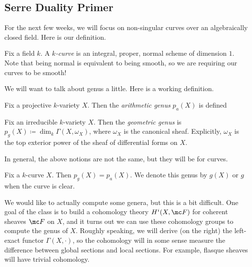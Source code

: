 \documentclass[../notes.tex]{subfiles}
\begin{document}
\subsection{Serre Duality Primer}
For the next few weeks, we will focus on non-singular curves over an algebraically closed field. Here is our definition.
\begin{definition}[curve]
	Fix a field $k$. A \textit{$k$-curve} is an integral, proper, normal scheme of dimension $1$. Note that being normal is equivalent to being smooth, so we are requiring our curves to be smooth!
\end{definition}
We will want to talk about genus a little. Here is a working definition.
\begin{definition}
	Fix a projective $k$-variety $X$. Then the \textit{arithmetic genus} $p_a(X)$ is defined
\end{definition}
\begin{definition}
	Fix an irreducible $k$-variety $X$. Then the \textit{geometric genus} is $p_g(X)\coloneqq\dim_k\Gamma(X,\omega_X)$, where $\omega_X$ is the canonical sheaf. Explicitly, $\omega_X$ is the top exterior power of the sheaf of differential forms on $X$.
\end{definition}
In general, the above notions are not the same, but they will be for curves.
\begin{proposition}
	Fix a $k$-curve $X$. Then $p_g(X)=p_a(X)$. We denote this genus by $g(X)$ or $g$ when the curve is clear.
\end{proposition}
We would like to actually compute some genera, but this is a bit difficult. One goal of the class is to build a cohomology theory $H^i(X,\mc F)$ for coherent sheaves $\mc F$ on $X$, and it turns out we can use these cohomology groups to compute the genus of $X$. Roughly speaking, we will derive (on the right) the left-exact functor $\Gamma(X,\cdot)$, so the cohomology will in some sense measure the difference between global sections and local sections. For example, flasque sheaves will have trivial cohomology.
\end{document}
